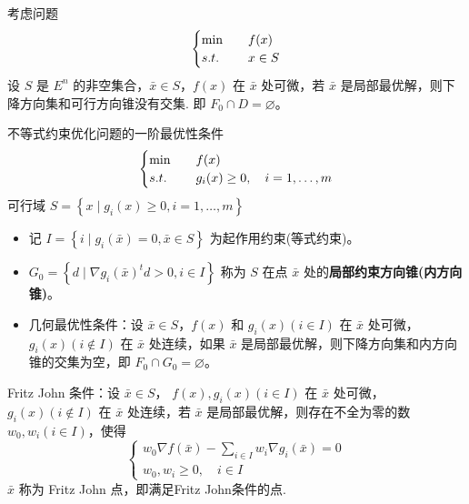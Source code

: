\begin{theorem}[几何最优性条件]
    考虑问题
    \[
        \begin{cases}
            \min \quad &f(x)\\
            s.t. \quad &x \in S
        \end{cases}    
    \]
    设 $S$ 是 $E^n$ 的非空集合，$\bar{x} \in S$，$f(x)$ 在 $\bar{x}$ 处可微，若 $\bar{x}$ 是局部最优解，则下降方向集和可行方向锥没有交集. 即 $F_0\cap D = \varnothing$。
\end{theorem}

\begin{theorem}
    不等式约束优化问题的一阶最优性条件
    \[
        \begin{cases}
            \min \quad &f(x)\\
            s.t. \quad &g_i(x) \ge 0, \quad i = 1, \dots, m
        \end{cases}
    \]
    可行域 $S = \left\{x \mid g_i(x) \ge 0, i = 1, \dots, m\right\}$
    \begin{itemize}
        \item 记 $I = \left\{i \mid g_i(\bar{x}) = 0, \bar{x} \in S\right\}$ 为起作用约束(等式约束)。
        \item $G_0 = \left\{d \mid \nabla g_i(\bar{x})^td > 0, i \in I\right\}$ 称为 $S$ 在点 $\bar{x}$ 处的\textbf{局部约束方向锥(内方向锥)}。
        \item 几何最优性条件：设 $\bar{x} \in S$，$f(x)$ 和 $g_i(x)(i \in I)$ 在 $\bar{x}$ 处可微，$g_i(x)(i \notin I)$ 在 $\bar{x}$ 处连续，如果 $\bar{x}$ 是局部最优解，则下降方向集和内方向锥的交集为空，即 $F_0\cap G_0 = \varnothing$。
    \end{itemize}
\end{theorem}

\begin{theorem}
    Fritz John 条件：设 $\bar{x} \in S$， $f(x), g_i(x)(i \in I)$ 在 $\bar{x}$ 处可微，$g_i(x)(i\notin I)$ 在 $\bar{x}$ 处连续，若 $\bar{x}$ 是局部最优解，则存在不全为零的数 $w_0, w_i(i \in I)$，使得 
    \[
        \begin{cases}
            w_{0} \nabla f(\bar{x})-\sum_{i \in I} w_{i} \nabla g_{i}(\bar{x})=0 \\
            w_{0}, w_{i} \geq 0, \quad i \in I
        \end{cases}
    \] 
    $\bar{x}$ 称为 Fritz John 点，即满足Fritz John条件的点.
\end{theorem}


